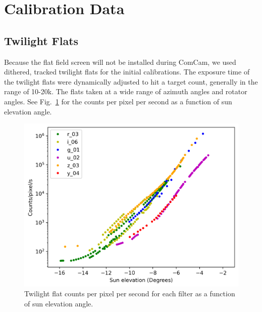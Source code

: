 \section{Calibration Data}
\label{sec:calibration_date}

\subsection{Twilight Flats}

Because the flat field screen will not be installed during ComCam, we used dithered, tracked twilight flats for the initial calibrations. The exposure time of the twilight flats were dynamically adjusted to hit a target count, generally in the range of 10-20k. The flats taken at a wide range of azimuth angles and rotator angles. See Fig.~\ref{fig:twilight_counts} for the counts per pixel per second as a function of sun elevation angle.

\begin{figure}
  \includegraphics{calibration_data_figures/twilight_flat_counts.png}
  \caption{Twilight flat counts per pixel per second for each filter as a function of sun elevation angle.}
  \label{fig:twilight_counts}
\end{figure}
  